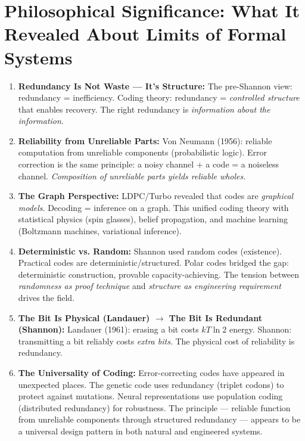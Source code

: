 \section{Philosophical Significance: What It Revealed About Limits of Formal Systems}
\label{sec:ec:philosophical}

\begin{enumerate}
\item \textbf{Redundancy Is Not Waste — It's Structure:} The pre-Shannon view: redundancy = inefficiency. Coding theory: redundancy = \emph{controlled structure} that enables recovery. The right redundancy is \emph{information about the information}.

\item \textbf{Reliability from Unreliable Parts:} Von Neumann (1956): reliable computation from unreliable components (probabilistic logic). Error correction is the same principle: a noisy channel + a code = a noiseless channel. \emph{Composition of unreliable parts yields reliable wholes.}

\item \textbf{The Graph Perspective:} LDPC/Turbo revealed that codes are \emph{graphical models}. Decoding = inference on a graph. This unified coding theory with statistical physics (spin glasses), belief propagation, and machine learning (Boltzmann machines, variational inference).

\item \textbf{Deterministic vs. Random:} Shannon used random codes (existence). Practical codes are deterministic/structured. Polar codes bridged the gap: deterministic construction, provable capacity-achieving. The tension between \emph{randomness as proof technique} and \emph{structure as engineering requirement} drives the field.

\item \textbf{The Bit Is Physical (Landauer) $\to$ The Bit Is Redundant (Shannon):} Landauer (1961): erasing a bit costs $kT \ln 2$ energy. Shannon: transmitting a bit reliably costs \emph{extra bits}. The physical cost of reliability is redundancy.

\item \textbf{The Universality of Coding:} Error-correcting codes have appeared in unexpected places. The genetic code uses redundancy (triplet codons) to protect against mutations. Neural representations use population coding (distributed redundancy) for robustness. The principle — reliable function from unreliable components through structured redundancy — appears to be a universal design pattern in both natural and engineered systems.
\end{enumerate}

